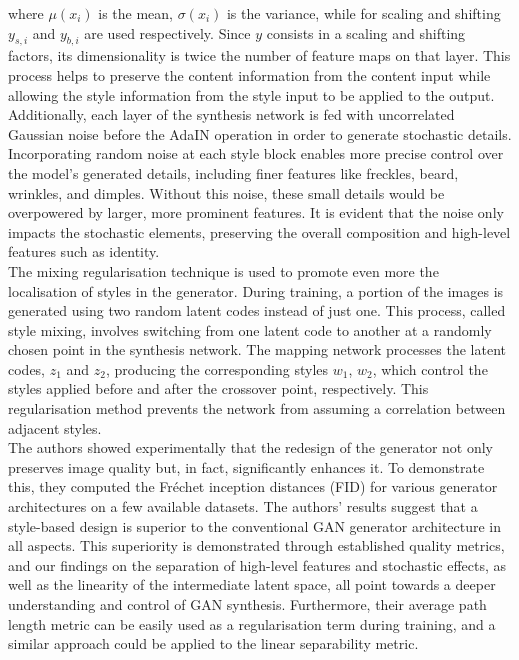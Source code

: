 \noindent where $\mu(x_i)$ is the mean, $\sigma(x_i)$ is the variance, while for scaling and shifting $y_{s,i}$ and $y_{b,i}$ are used respectively. Since $y$ consists in a scaling and shifting factors, its dimensionality is twice the number of feature maps on that layer.
This process helps to preserve the content information from the content input while allowing the style information from the style input to be applied to the output.
Additionally, each layer of the synthesis network is fed with uncorrelated Gaussian noise before the AdaIN operation in order to generate stochastic details. Incorporating random noise at each style block enables more precise control over the model's generated details, including finer features like freckles, beard, wrinkles, and dimples. Without this noise, these small details would be overpowered by larger, more prominent features. It is evident that the noise only impacts the stochastic elements, preserving the overall composition and high-level features such as identity.\\
The mixing regularisation technique is used to promote even more the localisation of styles in the generator. During training, a portion of the images is generated using two random latent codes instead of just one. This process, called style mixing, involves switching from one latent code to another at a randomly chosen point in the synthesis network. The mapping network processes the latent codes, $z_1$ and $z_2$, producing the corresponding styles $w_1$, $w_2$, which control the styles applied before and after the crossover point, respectively. This regularisation method prevents the network from assuming a correlation between adjacent styles. \\
\noindent The authors showed experimentally that the redesign of the generator not only preserves image quality but, in fact, significantly enhances it. To demonstrate this, they computed the Fréchet inception distances (FID) for various generator architectures on a few available datasets.
The authors' results suggest that a style-based design is superior to the conventional GAN generator architecture in all aspects. This superiority is demonstrated through established quality metrics, and our findings on the separation of high-level features and stochastic effects, as well as the linearity of the intermediate latent space, all point towards a deeper understanding and control of GAN synthesis.
Furthermore, their average path length metric can be easily used as a regularisation term during training, and a similar approach could be applied to the linear separability metric.

